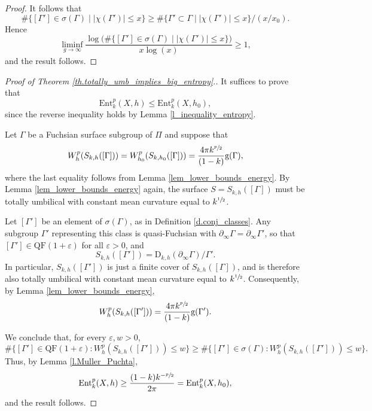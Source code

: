 \documentclass[JEP,XML,SOM,Unicode,NoEqCountersInSection,published]{cedram}
\theoremstyle{plain}
\theoremstyle{definition}
\let\eps\varepsilon
\newcommand{\Ent}{\mathrm{Ent}}
\newcommand{\QF}{\mathrm{QF}}
\newcommand{\bord}{\partial_{\infty}}
\begin{document}
\begin{proof}
It follows that
\begin{equation*}
\#\{[\Gamma']\in\sigma(\Gamma)\mid \left|\chi(\Gamma')\right| \leq x\}
\geq \#\{\Gamma'\subset\Gamma\mid \left|\chi(\Gamma')\right| \leq x\}/(x/x_0).
\end{equation*}
Hence
\begin{equation*}
\liminf_{g\to\infty}\frac{\log\bigl(\#\{[\Gamma']\in\sigma(\Gamma)\mid \left|\chi(\Gamma')\right|\leq x\}\bigr)}{x\log(x)} \geq 1,
\end{equation*}
and the result follows.
\end{proof}

\begin{proof}[Proof of Theorem \ref{th.totally_umb_implies_big_entropy}.] It suffices to prove that
\begin{equation*}
\Ent^{p}_{k}(X,h)\leq\Ent^{p}_{k}(X,h_0),
\end{equation*}
since the reverse inequality holds by Lemma \ref{l_inequality_entropy}.

Let $\Gamma$ be a Fuchsian surface subgroup of $\Pi$ and suppose that
\begin{equation*}
W^{p}_{h}(S_{k,h}([\Gamma]))=W^{p}_{h_0}(S_{k,h_0}([\Gamma]))=\frac{4\pi k^{\sfrac{p}{2}}}{(1-k)}\mathrm{g}(\Gamma),
\end{equation*}
where the last equality follows from Lemma \ref{lem_lower_bounds_energy}. By Lemma \ref{lem_lower_bounds_energy} again, the surface $S=S_{k,h}([\Gamma])$ must be totally umbilical with constant mean curvature equal to $k^{\sfrac{1}{2}}$.

Let $[\Gamma']$ be an element of $\sigma(\Gamma)$, as in Definition \ref{d.conj_classes}. Any subgroup $\Gamma'$ representing this class is quasi-Fuchsian with $\bord \Gamma=\bord \Gamma'$, so that $[\Gamma']\in\QF(1+\eps)$ for all $\eps>0$, and
\begin{equation*}
S_{k,h}([\Gamma'])=\mathrm{D}_{k,h}(\bord \Gamma)/\Gamma'.
\end{equation*}
In particular, $S_{k,h}([\Gamma'])$ is just a finite cover of $S_{k,h}([\Gamma])$, and is therefore also totally umbilical with constant mean curvature equal to $k^{\sfrac{1}{2}}$. Consequently, by Lemma \ref{lem_lower_bounds_energy},
\begin{equation*}
W^{p}_{h}(S_{k,h}([\Gamma']))=\frac{4\pi k^{\sfrac{p}{2}}}{(1-k)}\mathrm{g}(\Gamma').
\end{equation*}

We conclude that, for every $\eps,w>0$,
\begin{equation*}
\#\{[\Gamma']\in\QF(1+\eps):W^{p}_{h}(S_{k,h}([\Gamma']))\leq w\}\geq \#\{[\Gamma']\in\sigma(\Gamma):W^{p}_{h}(S_{k,h}([\Gamma']))\leq w\}.
\end{equation*}
Thus, by Lemma \ref{l.Muller_Puchta},
\begin{equation*}
\Ent^{p}_{k}(X,h)\geq\frac{(1-k)k^{-\sfrac{p}{2}}}{2\pi}=\Ent^{p}_{k}(X,h_0),
\end{equation*}
and the result follows.
\end{proof}
\end{document}
